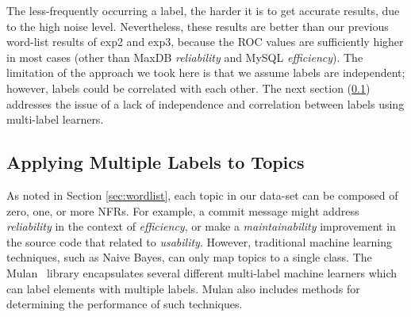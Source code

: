 \documentclass[smallextended]{svjour3}       %
\begin{document}
The less-frequently occurring a label, the harder it is to get accurate
results, due to the high noise level. Nevertheless, these results are
better than our previous word-list results of \textsf{exp2} and
\textsf{exp3}, because the ROC values are sufficiently higher in most
cases (other than MaxDB \emph{reliability} and MySQL \emph{efficiency}). The
limitation of the approach we took here is that we assume labels are
independent; however, labels could be correlated with each other. 
The next section (\ref{sec:multilabel})
addresses the issue of a lack of independence and correlation between
labels
using multi-label learners.


\subsection{Applying Multiple Labels to Topics}
\label{sec:multilabel}

As noted in Section \ref{sec:wordlist}, each topic in our data-set can be composed of zero, one, or more NFRs. 
For example, a commit message might address \textit{reliability} in the context of \textit{efficiency}, or make a \textit{maintainability} improvement
in the source code that related to \textit{usability}. 
However, traditional machine learning techniques, such as Naive Bayes, can only map topics to a single class. 
The Mulan~\cite{mulan} library encapsulates several different multi-label machine learners which can label elements with multiple labels.
Mulan also includes methods for determining the performance of such techniques.
\end{document}
